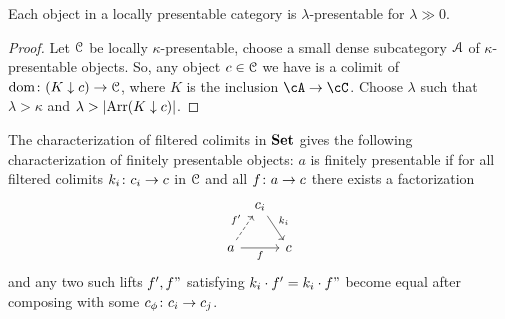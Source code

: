 \documentclass[a4paper,11pt,oneside,openany]{scrbook}
\begin{document}
\begin{prop}
	Each object in a locally presentable category is $ \lambda $-presentable
	for $ \lambda \gg 0 $.
\end{prop}
\begin{proof}
	Let $ \operatorname{\mathcal{C}} $ be locally $\kappa $-presentable, choose a small dense subcategory $\operatorname{\mathcal{A}} $ of $ \kappa $-presentable objects.
	So, any object $ c \in \operatorname{\mathcal{C}} $ we have is a colimit of $\operatorname{dom}\colon (K\downarrow
    c)\rightarrow\operatorname{\mathcal{C}}$, where $K$ is the inclusion $\cA\rightarrow\cC$.
	Choose $ \lambda $ such that $ \lambda > \kappa $ and $ \lambda >
    \left\lvert \operatorname{Arr}(K\downarrow c) \right\rvert $.
\end{proof}
The characterization of filtered colimits in $ {\normalfont\textbf{Set}} $ gives the following
characterization of finitely presentable objects: $ a $ is finitely presentable
if for all filtered colimits $ k_i \colon c_i \to c $ in $ \operatorname{\mathcal{C}} $ and all $ f\colon
a \to c $ there exists a factorization
\begin{displaymath}
	\begin{tikzcd}[column sep=tiny]
		& c_i \arrow[dr, "k_i"]&\\
		a \arrow[ur, dashed, "f'"]\arrow[rr, "f"']&& c
	\end{tikzcd}
\end{displaymath}
and any two such lifts $f',f"$ satisfying $k_i\cdot f'=k_i\cdot f"$ become equal
after composing with some $c_\phi\colon c_i\to c_j$.
\end{document}
